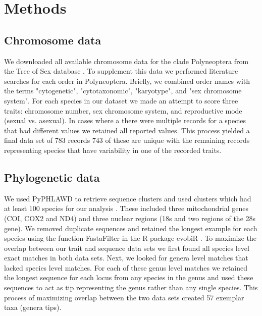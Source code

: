 
\section{Methods}

\subsection{Chromosome data}
We downloaded all available chromosome data for the clade Polyneoptera from the Tree of Sex database \citep{blackmon2016,TOS2014}.
To supplement this data we performed literature searches for each order in Polyneoptera.
Briefly, we combined order names with the terms "cytogenetic", "cytotaxonomic", "karyotype", and "sex chromosome system". %
For each species in our dataset we made an attempt to score three traits: chromosome number, sex chromosome system, and reproductive mode (sexual vs. asexual).
In cases where a there were multiple records for a species that had different values we retained all reported values.
This process yielded a final data set of 783 records 743 of these are unique with the remaining records representing species that have variability in one of the recorded traits. 


\subsection{Phylogenetic data}
We used PyPHLAWD to retrieve sequence clusters and used clusters which had at least 100 species for our analysis \citep{smith2018phyphlawd}. 
These included three mitochondrial genes (COI, COX2 and ND4) and three nuclear regions (18s and two regions of the 28s gene). 
We removed duplicate sequences and retained the longest example for each species using the function FastaFilter in the R package evobiR \citep{blackmon2015evobir}.
To maximize the overlap between our trait and sequence data sets we first found all species level exact matches in both data sets.
Next, we looked for genera level matches that lacked species level matches.
For each of these genus level matches we retained the longest sequence for each locus from any species in the genus and used these sequences to act as tip representing the genus rather than any single species. 
This process of maximizing overlap between the two data sets created 57 exemplar taxa (genera tips).

